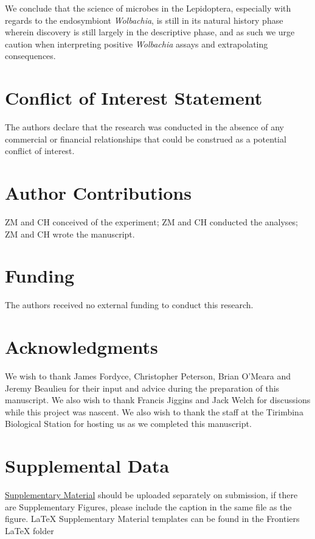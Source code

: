 \documentclass{frontiersSCNS} %
\begin{document}
\citet{vanNieukerken:2011a123}

\citet{Jiggins:2001p7754}

\citet{Jiggins:2001uo}


We conclude that the science of microbes in the Lepidoptera, especially with regards to the endosymbiont \textit{Wolbachia}, is still in its natural history phase wherein discovery is still largely in the descriptive phase, and as such we urge caution when interpreting positive \textit{Wolbachia} assays and extrapolating consequences. 



\newpage


\section*{Conflict of Interest Statement}
The authors declare that the research was conducted in the absence of any commercial or financial relationships that could be construed as a potential conflict of interest.


\section*{Author Contributions}
ZM and CH conceived of the experiment; ZM and CH conducted the analyses; ZM and CH wrote the manuscript. 

\section*{Funding}
The authors received no external funding to conduct this research.

\section*{Acknowledgments}
We wish to thank James Fordyce, Christopher Peterson, Brian O'Meara and Jeremy Beaulieu for their input and advice during the preparation of this manuscript. We also wish to thank Francis Jiggins and Jack Welch for discussions while this project was nascent. We also wish to thank the staff at the Tirimbina Biological Station for hosting us as we completed this manuscript. 

\section*{Supplemental Data}
 \href{http://home.frontiersin.org/about/author-guidelines#SupplementaryMaterial}{Supplementary Material} should be uploaded separately on submission, if there are Supplementary Figures, please include the caption in the same file as the figure. LaTeX Supplementary Material templates can be found in the Frontiers LaTeX folder 
\newpage
 

\newpage 
\end{document}
